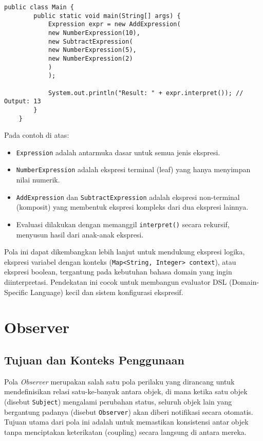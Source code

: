 \begin{lstlisting}[style=JavaStyle, caption={Client: Evaluasi Ekspresi}, label={lst:interpreter-main}]
	public class Main {
		public static void main(String[] args) {
			Expression expr = new AddExpression(
			new NumberExpression(10),
			new SubtractExpression(
			new NumberExpression(5),
			new NumberExpression(2)
			)
			);
			
			System.out.println("Result: " + expr.interpret()); // Output: 13
		}
	}
\end{lstlisting}

Pada contoh di atas:
\begin{itemize}
	\item \texttt{Expression} adalah antarmuka dasar untuk semua jenis ekspresi.
	\item \texttt{NumberExpression} adalah ekspresi terminal (leaf) yang hanya menyimpan nilai numerik.
	\item \texttt{AddExpression} dan \texttt{SubtractExpression} adalah ekspresi non-terminal (komposit) yang membentuk ekspresi kompleks dari dua ekspresi lainnya.
	\item Evaluasi dilakukan dengan memanggil \texttt{interpret()} secara rekursif, menyusun hasil dari anak-anak ekspresi.
\end{itemize}

Pola ini dapat dikembangkan lebih lanjut untuk mendukung ekspresi logika, ekspresi variabel dengan konteks (\texttt{Map<String, Integer> context}), atau ekspresi boolean, tergantung pada kebutuhan bahasa domain yang ingin diinterpretasi. Pendekatan ini cocok untuk membangun evaluator DSL (Domain-Specific Language) kecil dan sistem konfigurasi ekspresif.


\section{Observer}

\subsection{Tujuan dan Konteks Penggunaan}

Pola \textit{Observer} merupakan salah satu pola perilaku yang dirancang untuk mendefinisikan relasi satu-ke-banyak antara objek, di mana ketika satu objek (disebut \texttt{Subject}) mengalami perubahan status, seluruh objek lain yang bergantung padanya (disebut \texttt{Observer}) akan diberi notifikasi secara otomatis. Tujuan utama dari pola ini adalah untuk memastikan konsistensi antar objek tanpa menciptakan keterikatan (coupling) secara langsung di antara mereka.

